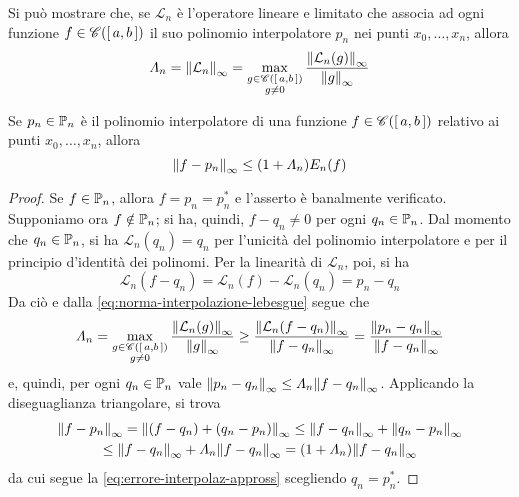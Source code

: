 	Si può mostrare che, se \(\mathcal{L}_n\) è l'operatore lineare e limitato che associa ad ogni funzione \(f \in \cont([\, a, b \,])\) il suo polinomio interpolatore \(p_n\) nei punti \(x_0, \dots, x_n\), allora
	\begin{equation}\label{eq:norma-interpolazione-lebesgue}
		\varLambda_n = \norm{\mathcal{L}_n}_\infty = \max_{\substack{g \in \cont ([\, a, b \,]) \\ g \ne 0}} \frac{\norm{\mathcal{L}_n (g)}_\infty}{\norm{g}_\infty}
	\end{equation}
	
	\begin{teorema}\label{th:errore-interpolaz-appross}
		Se \(p_n \in \P_n\) è il polinomio interpolatore di una funzione \(f \in \cont([\, a, b \,])\) relativo ai punti \(x_0, \dots, x_n\), allora
		\begin{equation}\label{eq:errore-interpolaz-appross}
			\norm{f - p_n}_\infty \le (1 + \varLambda_n) E_n (f)
		\end{equation}
	\end{teorema}

	\begin{proof}
		Se \(f \in \P_n\), allora \(f = p_n = p_n^*\) e l'asserto è banalmente verificato. Supponiamo ora \(f \notin \P_n\); si ha, quindi, \(f - q_n \ne 0\) per ogni \(q_n \in \P_n\). Dal momento che \(q_n \in \P_n\), si ha \(\mathcal{L}_n (q_n) = q_n\) per l'unicità del polinomio interpolatore e per il principio d'identità dei polinomi. Per la linearità di \(\mathcal{L}_n\), poi, si ha
		\begin{equation*}
			\mathcal{L}_n (f - q_n) = \mathcal{L}_n (f) - \mathcal{L}_n (q_n) = p_n - q_n
		\end{equation*}
		Da ciò e dalla \eqref{eq:norma-interpolazione-lebesgue} segue che
		\begin{equation*}
			\varLambda_n = \max_{\substack{g \in \cont ([\, a, b \,]) \\ g \ne 0}} \frac{\norm{\mathcal{L}_n (g)}_\infty}{\norm{g}_\infty} \ge \frac{\norm{\mathcal{L}_n (f - q_n)}_\infty}{\norm{f - q_n}_\infty} = \frac{\norm{p_n - q_n}_\infty}{\norm{f - q_n}_\infty}
		\end{equation*}
		e, quindi, per ogni \(q_n \in \P_n\) vale \(\norm{p_n - q_n}_\infty \le \varLambda_n \norm{f - q_n}_\infty\). Applicando la diseguaglianza triangolare, si trova
		\begin{multline*}
			\norm{f - p_n}_\infty = \norm{(f - q_n) + (q_n - p_n)}_\infty \le \norm{f - q_n}_\infty + \norm{q_n - p_n}_\infty \\
			\le \norm{f - q_n}_\infty + \varLambda_n \norm{f - q_n}_\infty = (1 + \varLambda_n) \norm{f - q_n}_\infty
		\end{multline*}
		da cui segue la \eqref{eq:errore-interpolaz-appross} scegliendo \(q_n = p_n^*\).
	\end{proof}

